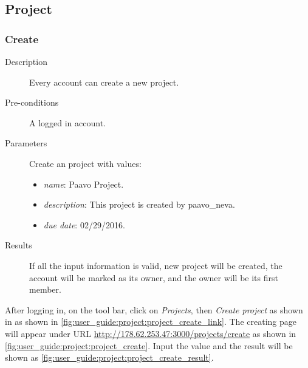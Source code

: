 \subsection{Project}
\label{ch:result:user_guide:project}
\subsubsection{Create}
\label{ch:result:user_guide:project:create}

\begin{description}
\item[Description] Every account can create a new project.
\item[Pre-conditions] A logged in account.
\item[Parameters] Create an project with values:
\begin{itemize}
\item \emph{name}: Paavo Project.
\item \emph{description}:  This project is created by paavo\_neva.
\item \emph{due date}: 02/29/2016.
\end{itemize}
\item[Results] If all the input information is valid, new project will be created, the account will be marked as its owner, and the owner will be its first member.
\end{description}

After logging in, on the tool bar, click on \emph{Projects}, then \emph{Create project} as shown in as shown in \autoref{fig:user_guide:project:project_create_link}.
The creating page will appear under URL \href{http://178.62.253.47:3000/projects/create}{http://178.62.253.47:3000/projects/create} as shown in \autoref{fig:user_guide:project:project_create}.
Input the value and the result will be shown as \autoref{fig:user_guide:project:project_create_result}.


